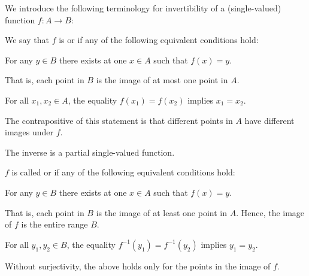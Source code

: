 \begin{definition}\label{def:function_invertibility}
  We introduce the following terminology for invertibility of a (single-valued) function \( f: A \to B \):
  \begin{thmenum}
    \begin{minipage}[t]{0.43\textwidth}
       We say that \( f \) is  or  if any of the following equivalent conditions hold:
      \begin{thmenum}
         For any \( y \in B \) there exists at  one \( x \in A \) such that \( f(x) = y \).

        That is, each point in \( B \) is the image of at most one point in \( A \).
        \newline

         For all \( x_1, x_2 \in A \), the equality \( f(x_1) = f(x_2) \) implies \( x_1 = x_2 \).

        The contrapositive of this statement is that different points in \( A \) have different images under \( f \).

         The inverse is a partial single-valued function.
      \end{thmenum}
    \end{minipage}
    \hfill
    \begin{minipage}[t]{0.44\textwidth}
       \( f \) is called  or  if any of the following equivalent conditions hold:
      \newline
      \begin{thmenum}[leftmargin=0.9cm]
         For any \( y \in B \) there exists at  one \( x \in A \) such that \( f(x) = y \).

        That is, each point in \( B \) is the image of at least one point in \( A \). Hence, the image of \( f \) is the entire range \( B \).

         For all \( y_1, y_2 \in B \), the equality \( f^{-1}(y_1) = f^{-1}(y_2) \) implies \( y_1 = y_2 \).

        Without surjectivity, the above holds only for the points in the image of \( f \).


\end{thmenum}
\end{minipage}
\end{thmenum}
\end{definition}
